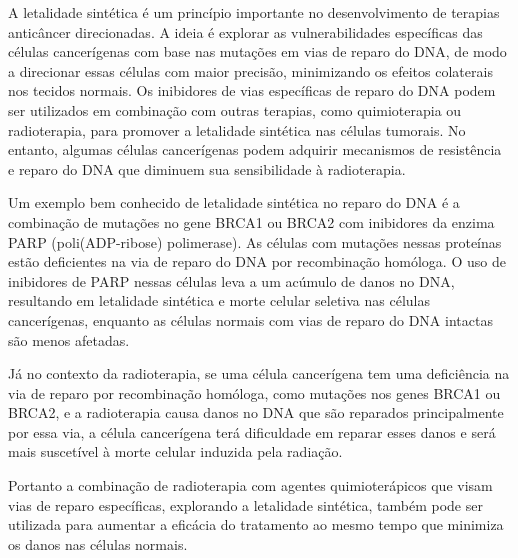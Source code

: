 \documentclass[11pt,a4paper]{article}
\newcounter{exemplo}
\begin{document}
	A letalidade sintética é um princípio importante no desenvolvimento de terapias anticâncer direcionadas. A ideia é explorar as vulnerabilidades específicas das células cancerígenas com base nas mutações em vias de reparo do DNA, de modo a direcionar essas células com maior precisão, minimizando os efeitos colaterais nos tecidos normais. Os inibidores de vias específicas de reparo do DNA podem ser utilizados em combinação com outras terapias, como quimioterapia ou radioterapia, para promover a letalidade sintética nas células tumorais. No entanto, algumas células cancerígenas podem adquirir mecanismos de resistência e reparo do DNA que diminuem sua sensibilidade à radioterapia.

	Um exemplo bem conhecido de letalidade sintética no reparo do DNA é a combinação de mutações no gene BRCA1 ou BRCA2 com inibidores da enzima PARP (poli(ADP-ribose) polimerase).  As células com mutações nessas proteínas estão deficientes na via de reparo do DNA por recombinação homóloga. O uso de inibidores de PARP nessas células leva a um acúmulo de danos no DNA, resultando em letalidade sintética e morte celular seletiva nas células cancerígenas, enquanto as células normais com vias de reparo do DNA intactas são menos afetadas. 
	
	Já no contexto da radioterapia, se uma célula cancerígena tem uma deficiência na via de reparo por recombinação homóloga, como mutações nos genes BRCA1 ou BRCA2, e a radioterapia causa danos no DNA que são reparados principalmente por essa via, a célula cancerígena terá dificuldade em reparar esses danos e será mais suscetível à morte celular induzida pela radiação. 
	
	Portanto a combinação de radioterapia com agentes quimioterápicos que visam vias de reparo específicas, explorando a letalidade sintética, também pode ser utilizada para aumentar a eficácia do tratamento ao mesmo tempo que minimiza os danos nas células normais.


\end{document}
